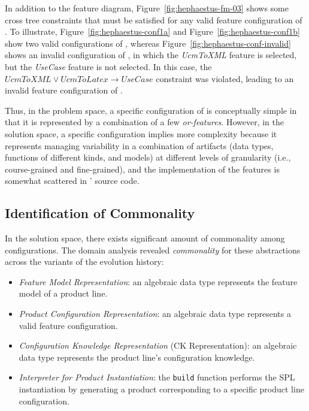 
In addition to the feature diagram, Figure~\ref{fig:hephaestus-fm-03} shows some cross tree constraints that must be satisfied for any valid feature configuration of \hpl.  To illustrate, Figure~\ref{fig:hephaestus-conf1a} and Figure~\ref{fig:hephaestus-conf1b} show two valid configurations of \hpl, whereas Figure~\ref{fig:hephaestus-conf-invalid} shows an invalid configuration of \hpl, in which the \emph{UcmToXML} feature is selected, but the \emph{UseCase} feature is not selected. In this case, the $UcmToXML \lor UcmToLatex \rightarrow Use Case$ constraint was violated, leading to an invalid feature configuration of \hpl.

Thus, in the problem space, a specific configuration of \hp{} is conceptually simple in that it is represented by a combination of a few \textit{or-features}. However, in the solution space, a specific configuration implies more complexity because it represents managing variability in a combination of artifacts (data types, functions of different kinds, and models) at different levels of granularity (i.e., course-grained and fine-grained), and the implementation of the features is somewhat scattered in \hp' source code.


\subsection{Identification of Commonality} 
\label{commonality}

In the solution space, there exists significant amount of commonality among configurations. 
The domain analysis revealed \emph{commonality} for these abstractions across the variants of the evolution history:

\begin{itemize}

\item \emph{Feature Model Representation}: an algebraic data type represents the feature model of a product line.
  
\item \emph{Product Configuration Representation}: an algebraic data type represents a valid feature configuration.

\item \emph{Configuration Knowledge Representation} (CK Representation): an algebraic data type represents the product line's configuration knowledge.

\item \emph{Interpreter for Product Instantiation}: the \texttt{build} function performs the SPL instantiation by generating a product corresponding to a specific product line configuration.

\end{itemize}


